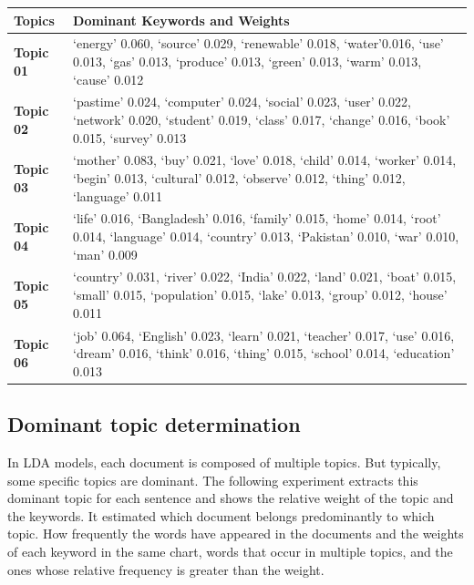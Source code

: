 \documentclass[sn-mathphys,Numbered]{sn-jnl}%
\theoremstyle{thmstyleone}%
\theoremstyle{thmstyletwo}%
\theoremstyle{thmstylethree}%
\begin{document}
\begin{longtable}[]{@{}
  >{\raggedright\arraybackslash}p{}     
  >{\raggedright\arraybackslash}p{}@{}}
\toprule
Topics & Dominant Keywords and Weights \\
\midrule
\endhead
\textbf{Topic 01} & \enquote*{energy} 0.060, \enquote*{source} 0.029, \enquote*{renewable} 0.018, \enquote*{water}0.016, \enquote*{use} 0.013, \enquote*{gas} 0.013, \enquote*{produce} 0.013, \enquote*{green} 0.013, \enquote*{warm}
0.013, \enquote*{cause} 0.012 
\\
\textbf{Topic 02} & \enquote*{pastime} 0.024, \enquote*{computer} 0.024, \enquote*{social} 0.023, \enquote*{user} 0.022, \enquote*{network} 0.020, \enquote*{student} 0.019, \enquote*{class} 0.017, \enquote*{change} 0.016, \enquote*{book} 0.015, \enquote*{survey} 0.013  
\\
\textbf{Topic 03 }& \enquote*{mother} 0.083, \enquote*{buy} 0.021, \enquote*{love} 0.018, \enquote*{child} 0.014, \enquote*{worker} 0.014, \enquote*{begin} 0.013, \enquote*{cultural} 0.012, \enquote*{observe} 0.012, \enquote*{thing} 0.012, \enquote*{language} 0.011 
\\ 
\textbf{Topic 04} &  \enquote*{life} 0.016, \enquote*{Bangladesh} 0.016, \enquote*{family} 0.015, \enquote*{home} 0.014, \enquote*{root} 0.014, \enquote*{language} 0.014, \enquote*{country} 0.013, \enquote*{Pakistan} 0.010, \enquote*{war} 0.010, \enquote*{man} 0.009 
\\ 
\textbf{Topic 05} & \enquote*{country} 0.031, \enquote*{river} 0.022, \enquote*{India} 0.022, \enquote*{land} 0.021, \enquote*{boat} 0.015, \enquote*{small} 0.015, \enquote*{population} 0.015, \enquote*{lake} 0.013, \enquote*{group} 0.012, \enquote*{house} 0.011 
\\ 
\textbf{Topic 06} & \enquote*{job} 0.064, \enquote*{English} 0.023, \enquote*{learn} 0.021, \enquote*{teacher} 0.017, \enquote*{use} 0.016, \enquote*{dream} 0.016, \enquote*{think} 0.016, \enquote*{thing} 0.015, \enquote*{school} 0.014, \enquote*{education} 0.013\\
\bottomrule
\end{longtable}


\subsection{Dominant topic determination}\label{dom_topic}

In LDA models, each document is composed of multiple topics. But typically, some specific topics are dominant. The following experiment extracts this dominant topic for each sentence and shows the relative weight of the topic and the keywords. It estimated which document belongs predominantly to which topic. How frequently the words have appeared in the documents and the weights of each keyword in the same chart, words that occur in multiple topics, and the ones whose relative frequency is greater than the weight.
\end{document}

